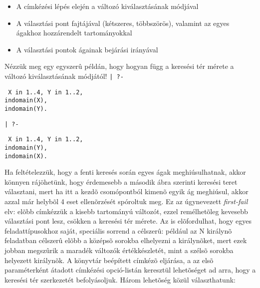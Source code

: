 \begin{itemize}
\item A címkézési lépés elején a változó kiválasztásának módjával
\item A választási pont fajtájával (kétszeres, többszörös), valamint az egyes ágakhoz
hozzárendelt tartományokkal
\item A választási pontok ágainak bejárási irányával
\end{itemize}

Nézzük meg egy egyszerû példán, hogy hogyan függ a keresési tér mérete a változó
kiválasztásának módjától!
\br
{\tt | ?- }\parbox[t]{0.3\textwidth}{\tt
X in 1..4, 
Y in 1..2,\\
indomain(X),\\
indomain(Y).
}
\br
{\tt | ?- }\parbox[t]{0.3\textwidth}{\tt
X in 1..4, 
Y in 1..2,\\
indomain(Y),\\
indomain(X).
}
\br
Ha feltételezzük, hogy a fenti keresés során egyes ágak meghiúsulhatnak, akkor könnyen
rájöhetünk, hogy érdemesebb a második ábra szerinti keresési teret választani, mert ha
itt a kezdõ csomópontból kimenõ egyik ág meghiúsul, akkor azzal már helybõl 4 eset
ellenõrzését spóroltuk meg. Ez az úgynevezett \emph{first-fail} elv: elõbb címkézzük
a kisebb tartományú változót, ezzel remélhetõleg kevesebb választási pont lesz,
csökken a keresési tér mérete. Az is elõfordulhat, hogy egyes feladattípusokhoz saját,
speciális sorrend a célszerû: például az N királynõ feladatban célszerû elõbb a középsõ
sorokba elhelyezni a királynõket, mert ezek jobban megszûrik a maradék változók
értékkészletét, mint a szélsõ sorokba helyezett királynõk.
\br
A \clpfd könyvtár beépített címkézõ eljárása, a  az elsõ paraméterként
átadott címkézési opció-listán keresztül lehetõséget ad arra, hogy a keresési tér
szerkezetét befolyásoljuk. Három lehetõség közül választhatunk:

